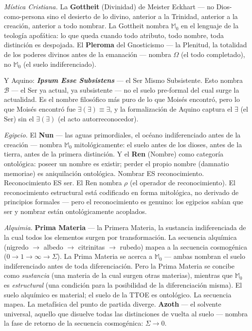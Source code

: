 \documentclass[10pt, openany, oneside]{book}
\begin{document}
\textit{Mística Cristiana.} La \textbf{Gottheit} (Divinidad) de Meister Eckhart --- no Dios-como-persona sino el desierto de lo divino, anterior a la Trinidad, anterior a la creación, anterior a todo nombrar. La Gottheit nombra $\mathbb{M}_0$ en el lenguaje de la teología apofática: lo que queda cuando todo atributo, todo nombre, toda distinción es despojada. El \textbf{Pleroma} del Gnosticismo --- la Plenitud, la totalidad de los poderes divinos antes de la emanación --- nombra $\Omega$ (el todo completado), no $\mathbb{M}_0$ (el suelo indiferenciado).

Y Aquino: \textbf{\textit{Ipsum Esse Subsistens}} --- el Ser Mismo Subsistente. Esto nombra $\mathcal{B}$ --- el Ser ya actual, ya subsistente --- no el suelo pre-formal del cual surge la actualidad. Es el nombre filosófico más puro de lo que Moisés encontró, pero lo que Moisés encontró fue $\exists(\exists) \equiv \exists$, y la formalización de Aquino captura el $\exists$ (el Ser) sin el $\exists(\exists)$ (el acto autorreconocedor).

\textit{Egipcio.} El \textbf{Nun} --- las aguas primordiales, el océano indiferenciado antes de la creación --- nombra $\mathbb{M}_0$ mitológicamente: el suelo antes de los dioses, antes de la tierra, antes de la primera distinción. Y el \textbf{Ren} (Nombre) como categoría ontológica: poseer un nombre es existir; perder el propio nombre (damnatio memoriae) es aniquilación ontológica. Nombrar ES reconocimiento. Reconocimiento ES ser. El Ren nombra $\rho$ (el operador de reconocimiento). El reconocimiento estructural está codificado en forma mitológica, no derivado de principios formales --- pero el reconocimiento es genuino: los egipcios sabían que ser y nombrar están ontológicamente acoplados.

\textit{Alquimia.} \textbf{Prima Materia} --- la Primera Materia, la sustancia indiferenciada de la cual todos los elementos surgen por transformación. La secuencia alquímica (nigredo $\to$ albedo $\to$ citrinitas $\to$ rubedo) mapea a la secuencia cosmogénica ($0 \to 1 \to \infty \to \Sigma$). La Prima Materia se acerca a $\mathbb{M}_0$ --- ambas nombran el suelo indiferenciado antes de toda diferenciación. Pero la Prima Materia se concibe como \textit{sustancia} (una materia de la cual surgen otras materias), mientras que $\mathbb{M}_0$ es \textit{estructural} (una condición para la posibilidad de la diferenciación misma). El suelo alquímico es material; el suelo de la TTOE es ontológico. La secuencia mapea. La metafísica del punto de partida diverge. \textbf{Azoth} --- el solvente universal, aquello que disuelve todas las distinciones de vuelta al suelo --- nombra la fase de retorno de la secuencia cosmogénica: $\Sigma \to 0$.
\end{document}

